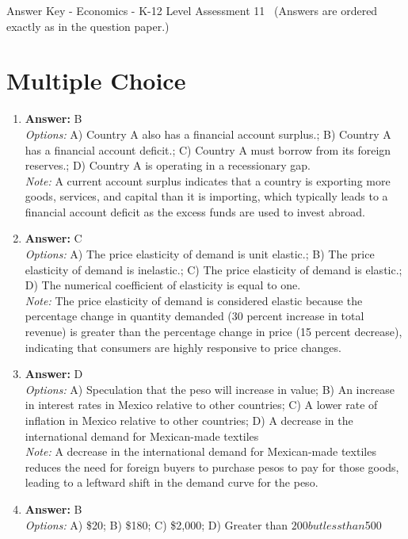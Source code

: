 \documentclass[12pt]{article}
\begin{document}
\begin{center}
Answer Key - Economics - K-12 Level Assessment 11 \
\small (Answers are ordered exactly as in the question paper.)
\end{center}

\section*{Multiple Choice}
\begin{enumerate}[label=\arabic*.]
\item \textbf{Answer:} B
\\ \textit{Options:} A) Country A also has a financial account surplus.; B) Country A has a financial account deficit.; C) Country A must borrow from its foreign reserves.; D) Country A is operating in a recessionary gap.
\\ \textit{Note:} A current account surplus indicates that a country is exporting more goods, services, and capital than it is importing, which typically leads to a financial account deficit as the excess funds are used to invest abroad.
\item \textbf{Answer:} C
\\ \textit{Options:} A) The price elasticity of demand is unit elastic.; B) The price elasticity of demand is inelastic.; C) The price elasticity of demand is elastic.; D) The numerical coefficient of elasticity is equal to one.
\\ \textit{Note:} The price elasticity of demand is considered elastic because the percentage change in quantity demanded (30 percent increase in total revenue) is greater than the percentage change in price (15 percent decrease), indicating that consumers are highly responsive to price changes.
\item \textbf{Answer:} D
\\ \textit{Options:} A) Speculation that the peso will increase in value; B) An increase in interest rates in Mexico relative to other countries; C) A lower rate of inflation in Mexico relative to other countries; D) A decrease in the international demand for Mexican-made textiles
\\ \textit{Note:} A decrease in the international demand for Mexican-made textiles reduces the need for foreign buyers to purchase pesos to pay for those goods, leading to a leftward shift in the demand curve for the peso.
\item \textbf{Answer:} B
\\ \textit{Options:} A) \$20; B) \$180; C) \$2,000; D) Greater than $200 but less than $500

\end{enumerate}
\end{document}
